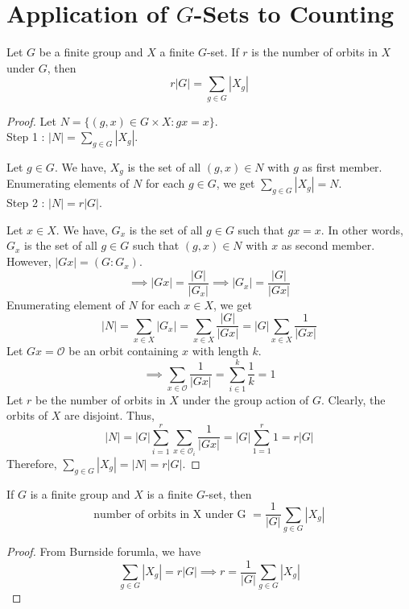 \section{Application of $G$-Sets to Counting}
\begin{theorem}[Burnside]
	Let $G$ be a finite group and $X$ a finite $G$-set.
	If $r$ is the number of orbits in $X$ under $G$, then
	\begin{equation}
		r|G| = \sum_{g \in G}|X_g|
	\end{equation}
\end{theorem}
\begin{proof}
	Let $N = \{ (g,x) \in G \times X : gx = x \}$.\\
	Step 1 : $|N| = \sum\limits_{g \in G}|X_g|$.

	Let $g \in G$.
	We have, $X_g$ is the set of all $(g,x) \in N$ with $g$ as first member.
	Enumerating elements of $N$ for each $g \in G$, we get $\sum\limits_{g \in G}|X_g| = N$. \\
	Step 2 : $|N| = r|G|$.

	Let $x \in X$.
	We have, $G_x$ is the set of all $g \in G$ such that $gx = x$.
	In other words, $G_x$ is the set of all $g \in G$ such that $(g,x) \in N$ with $x$ as second member.
	However, $|Gx| = (G:G_x)$.
	$$\implies |Gx| = \frac{|G|}{|G_x|} \implies |G_x| = \frac{|G|}{|Gx|}$$
	Enumerating element of $N$ for each $x \in X$, we get
	$$|N| = \sum\limits_{x \in X} |G_x| = \sum\limits_{x \in X} \frac{|G|}{|Gx|} = |G| \sum\limits_{x \in X} \frac{1}{|Gx|}$$
	Let $Gx = \mathscr{O}$ be an orbit containing $x$ with length $k$.
	$$\implies \sum\limits_{x \in \mathscr{O}} \frac{1}{|Gx|} = \sum\limits_{i \in 1}^k \frac{1}{k} = 1$$
	Let $r$ be the number of orbits in $X$ under the group action of $G$.
	Clearly, the orbits of $X$ are disjoint. Thus,
	$$|N| = |G|\sum\limits_{i = 1}^r \sum\limits_{x \in \mathscr{O}_i} \frac{1}{|Gx|} = |G|\sum\limits_{1 = 1}^r 1 = r|G|$$
	Therefore, $\sum\limits_{g \in G} |X_g| = |N| = r|G|$.
\end{proof}

\begin{corollary}
	If $G$ is a finite group and $X$ is a finite $G$-set, then
	\begin{equation}
		\text{number of orbits in X under G } = \frac{1}{|G|} \sum_{g \in G} |X_g|
	\end{equation}
\end{corollary}
\begin{proof}
	From Burnside forumla, we have
	$$\sum\limits_{g \in G}|X_g| = r|G| \implies r = \frac{1}{|G|} \sum\limits_{g \in G} |X_g|$$
\end{proof}

